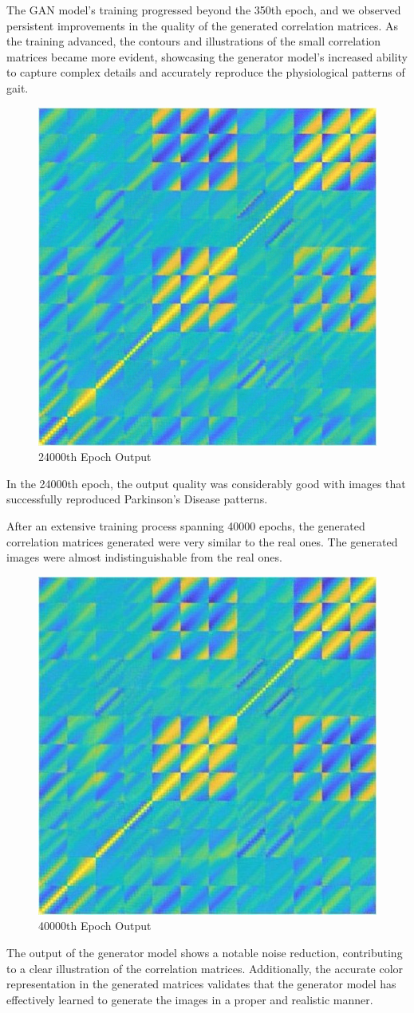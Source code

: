 \documentclass[12pt]{article}
\begin{document}
The GAN model's training progressed beyond the 350th epoch, and we observed persistent improvements in the quality of the generated correlation matrices. As the training advanced, the contours and illustrations of the small correlation matrices became more evident, showcasing the generator model's increased ability to capture complex details and accurately reproduce the physiological patterns of gait. 


\begin{figure}[h]
\includegraphics[width=5 cm]{generated_img_24000_0.png}
\centering
\caption{24000th Epoch Output}
\end{figure}


In the 24000th epoch, the output quality was considerably good with images that successfully reproduced Parkinson's Disease patterns. 

After an extensive training process spanning 40000 epochs, the generated correlation matrices generated were very similar to the real ones. The generated images were almost indistinguishable from the real ones. 

\begin{figure}[h]
\includegraphics[width=5 cm]{generated40000.jpeg}
\centering
\caption{40000th Epoch Output}
\end{figure}

The output of the generator model shows a notable noise reduction, contributing to a clear illustration of the correlation matrices. Additionally, the accurate color representation in the generated matrices validates that the generator model has effectively learned to generate the images in a proper and realistic manner.
\end{document}
